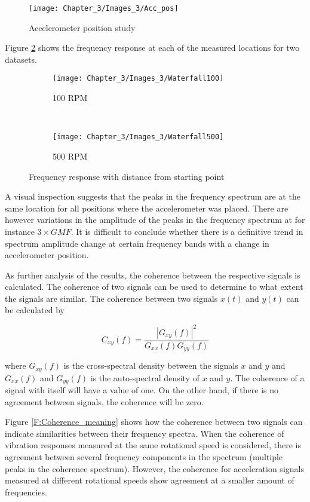 \begin{figure}[H]
	\centering
	\texttt{[image: Chapter\_3/Images\_3/Acc\_pos]}
	\caption{Accelerometer position study}
	\label{F:Acc_pos}
\end{figure}


Figure \ref{F:All_data} shows the frequency response at each of the measured locations for two datasets. 


\begin{figure}[H]
	\centering
	\begin{subfigure}{0.49\textwidth}
		\texttt{[image: Chapter\_3/Images\_3/Waterfall100]}
		\caption{100 RPM}
	\end{subfigure}
	~
	\begin{subfigure}{0.49\textwidth}
		\texttt{[image: Chapter\_3/Images\_3/Waterfall500]}
		\caption{500 RPM}
	\end{subfigure}
	
	\caption{Frequency response with distance from starting point}
	\label{F:All_data}
\end{figure}

A visual inspection suggests that the peaks in the frequency spectrum are at the same location for all positions where the accelerometer was placed. There are however variations in the amplitude of the peaks in the frequency spectrum at for instance $3\times GMF$. It is difficult to conclude whether there is a definitive trend in spectrum amplitude change at certain frequency bands with a change in accelerometer position.

As further analysis of the results, the coherence between the respective signals is calculated. The coherence of two signals can be used to determine to what extent the signals are similar. The coherence between two signals $x(t)$ and $y(t)$ can be calculated by


\begin{equation}
C_{x y}(f)=\frac{\left|G_{x y}(f)\right|^{2}}{G_{x x}(f) G_{y y}(f)}
\end{equation}

where $G_{x y}(f)$ is the cross-spectral density between the signals $x$ and $y$ and $G_{x x}(f)$ and $ G_{y y}(f)$ is the auto-spectral density of $x$ and $y$. The coherence of a signal with itself will have a value of one. On the other hand, if there is no agreement between signals, the coherence will be zero.

Figure \ref{F:Coherence_meaning} shows how the coherence between two signals can indicate similarities between their frequency spectra. When the coherence of vibration responses measured at the same rotational speed is considered, there is agreement between several frequency components in the spectrum (multiple peaks in the coherence spectrum). However, the coherence for acceleration signals measured at different rotational speeds show agreement at a smaller amount of frequencies. 

